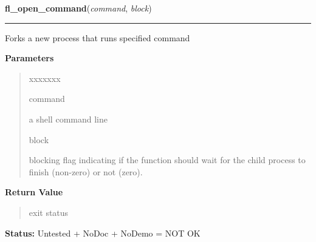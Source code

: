 \hspace{.8\funcindent}\begin{boxedminipage}{\funcwidth}

    \raggedright \textbf{fl\_open\_command}(\textit{command}, \textit{block})

    \vspace{-1.5ex}

    \rule{\textwidth}{0.5\fboxrule}
\setlength{\parskip}{2ex}
    Forks a new process that runs specified command

\setlength{\parskip}{1ex}
      \textbf{Parameters}
      \vspace{-1ex}

      \begin{quote}
        \begin{Ventry}{xxxxxxx}

          \item[command]

          a shell command line

          \item[block]

          blocking flag indicating if the function should wait for the 
          child process to finish (non-zero) or not (zero).

        \end{Ventry}

      \end{quote}

      \textbf{Return Value}
    \vspace{-1ex}

      \begin{quote}
      exit status

      \end{quote}

\textbf{Status:} Untested + NoDoc + NoDemo = NOT OK



    \end{boxedminipage}

    \label{xformslib:library:fl_end_command}

    \vspace{0.5ex}

